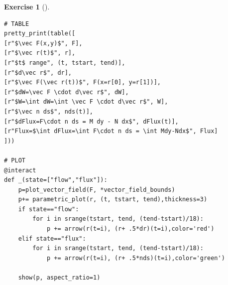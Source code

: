 \documentclass[10pt,]{book}
\theoremstyle{plain}
\theoremstyle{definition}
\theoremstyle{definition}
\theoremstyle{definition}
\theoremstyle{definition}
\newtheorem{exploration}[project]{Exercise}
\theoremstyle{definition}
\numberwithin{equation}{section}
\begin{document}
\begin{exploration}[]
\begin{enumerate}[font=\bfseries,label=(\alph*),ref=\alph*]
\begin{lstlisting}[style=sageinput]
# TABLE
pretty_print(table([
[r"$\vec F(x,y)$", F],
[r"$\vec r(t)$", r],
[r"$t$ range", (t, tstart, tend)],
[r"$d\vec r$", dr],
[r"$\vec F(\vec r(t))$", F(x=r[0], y=r[1])],
[r"$dW=\vec F \cdot d\vec r$", dW],
[r"$W=\int dW=\int \vec F \cdot d\vec r$", W],
[r"$\vec n ds$", nds(t)],
[r"$dFlux=F\cdot n ds = M dy - N dx$", dFlux(t)],
[r"Flux=$\int dFlux=\int F\cdot n ds = \int Mdy-Ndx$", Flux]
]))

# PLOT
@interact
def _(state=["flow","flux"]):
    p=plot_vector_field(F, *vector_field_bounds)
    p+= parametric_plot(r, (t, tstart, tend),thickness=3)
    if state=="flow":
        for i in srange(tstart, tend, (tend-tstart)/18):
            p += arrow(r(t=i), (r+ .5*dr)(t=i),color='red')
    elif state=="flux":
        for i in srange(tstart, tend, (tend-tstart)/18):
            p += arrow(r(t=i), (r+ .5*nds)(t=i),color='green')
    
    show(p, aspect_ratio=1)
\end{lstlisting}
\end{enumerate}
\end{exploration}
\end{document}
